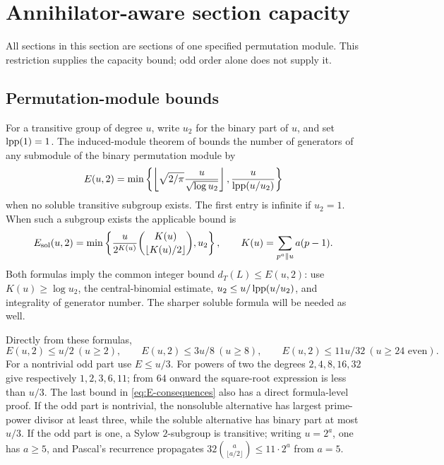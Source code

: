 \section{Annihilator-aware section capacity}\label{sec:capacity}
All sections in this section are sections of one specified permutation
module. This restriction supplies the capacity bound; odd order alone
does not supply it.

\subsection{Permutation-module bounds}
For a transitive group of degree $u$, write $u_2$ for the binary part
of $u$, and set $\operatorname{lpp}(1)=1$. The induced-module theorem of
\cite{Tracey2018} bounds the number of generators of any submodule of
the binary permutation module by
\[
 E(u,2)=\min\left\{
 \left\lfloor\sqrt{2/\pi}\frac{u}{\sqrt{\log u_2}}\right\rfloor,
 \frac{u}{\operatorname{lpp}(u/u_2)}\right\}
\]
when no soluble transitive subgroup exists. The first entry is infinite
if $u_2=1$. When such a subgroup exists the applicable bound is
\[
 E_{\rm sol}(u,2)=\min\left\{
 \frac{u}{2^{K(u)}}\binom{K(u)}{\lfloor K(u)/2\rfloor},u_2\right\},
 \qquad K(u)=\sum_{p^a\parallel u}a(p-1).
\]
Both formulas imply the common integer bound $d_T(L)\leq E(u,2)$:
use $K(u)\geq\log u_2$, the central-binomial estimate,
$u_2\leq u/\operatorname{lpp}(u/u_2)$, and integrality of generator number.
The sharper soluble formula will be needed as well.

Directly from these formulas,
\begin{equation}\label{eq:E-consequences}
 E(u,2)\leq u/2\ (u\geq2),\qquad
 E(u,2)\leq3u/8\ (u\geq8),\qquad
 E(u,2)\leq11u/32\ (u\geq24\text{ even}).
\end{equation}
For a nontrivial odd part use $E\leq u/3$. For powers of two the
degrees $2,4,8,16,32$ give respectively $1,2,3,6,11$; from $64$
onward the square-root expression is less than $u/3$.
The last bound in \eqref{eq:E-consequences} also has a direct
formula-level proof. If the odd part is nontrivial, the nonsoluble
alternative has largest prime-power divisor at least three, while the
soluble alternative has binary part at most $u/3$. If the odd part is
one, a Sylow $2$-subgroup is transitive; writing $u=2^a$, one has
$a\geq5$, and Pascal's recurrence propagates
$32\binom a{\lfloor a/2\rfloor}\leq11\cdot2^a$ from $a=5$.

